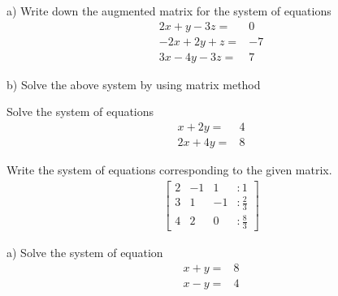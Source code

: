 \documentclass{exam}
\begin{document}
 
\begin{center}
\end{center}
 
\vspace{5mm}
 
 
\vspace{5mm}
 
 
\begin{questions}
	
	\question 
	\subitem a) Write down the augmented matrix for the system of equations
	\begin{align}
	\nonumber
	2x+y-3z=&0 \\ 
	\nonumber
   -2x+2y+z=&-7 \\ 
   \nonumber
	3x-4y-3z=&7  
	\end{align}
	 \vspace{6cm}
	
	\subitem b) Solve the above system by using matrix method
		\hfill\enspace\hrulefill
	
	\clearpage
	\question Solve the system of equations
	\hfill\enspace\hrulefill
	\begin{align}
	\nonumber
	x+2y=&4 \\ 
	\nonumber
	2x+4y=&8   
	\end{align}
	\vspace{6cm}
	
	\question Write the system of equations corresponding to the given matrix.\hfill\enspace\hrulefill
	\begin{align}
	\begin{bmatrix}
	2 &  -1&  1&  :1 \\
	3 &   1&  -1& : \frac{2}{3} \\
	4&    2&   0& :\frac{8}{3}
	\end{bmatrix}
	\end{align}
	
	\clearpage
	
	\question 
	\subitem a) Solve the system of equation
	\hfill\enspace\hrulefill
	\begin{align}
	\nonumber
	x+y=&8 \\ 
	\nonumber
	x-y=&4   
	\end{align}
	\vspace{6cm} 
	

\end{questions}
\end{document}
